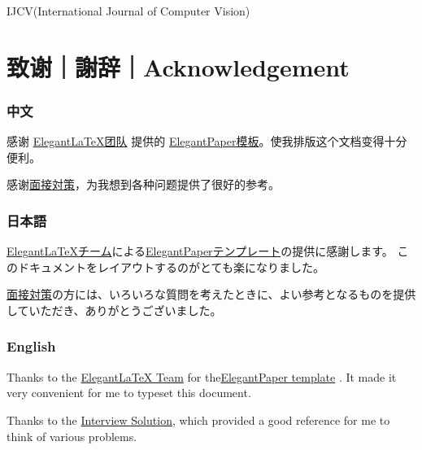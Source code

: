 \documentclass[lang=cn,11pt,a4paper]{elegantpaper}
\begin{document}
IJCV(International Journal of Computer Vision)

\section{致谢｜謝辞｜Acknowledgement}
\subsubsection{中文}
感谢  \href{https://elegantlatex.org/}{ElegantLaTeX团队} 提供的 \href{https://github.com/ElegantLaTeX/ElegantPaper}{ElegantPaper模板}。使我排版这个文档变得十分便利。

感谢\href{https://hatodove22.notion.site/16f0eba93f3c4153bd1f770892aaf6b1}{面接対策}，为我想到各种问题提供了很好的参考。
\subsubsection{日本語}
\href{https://elegantlatex.org/}{ElegantLaTeXチーム}による\href{https://github.com/ElegantLaTeX/ElegantPaper}{ElegantPaperテンプレート}の提供に感謝します。 このドキュメントをレイアウトするのがとても楽になりました。

\href{https://hatodove22.notion.site/16f0eba93f3c4153bd1f770892aaf6b1}{面接対策}の方には、いろいろな質問を考えたときに、よい参考となるものを提供していただき、ありがとうございました。
\subsubsection{English}
Thanks to the \href{https://elegantlatex.org/}{ElegantLaTeX Team}  for the\href{https://github.com/ElegantLaTeX/ElegantPaper}{ElegantPaper template} . It made it very convenient for me to typeset this document.

Thanks to the \href{https://hatodove22.notion.site/16f0eba93f3c4153bd1f770892aaf6b1}{Interview Solution}, which provided a good reference for me to think of various problems.


\nocite{*}

\end{document}
